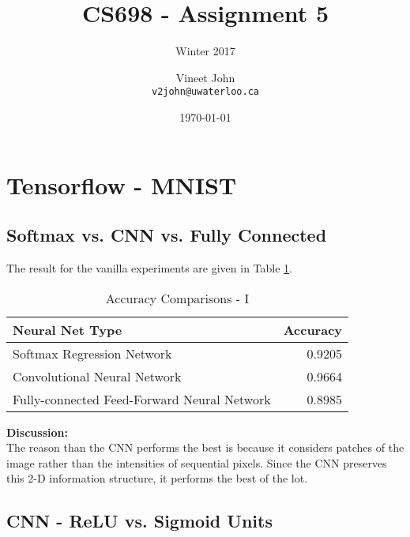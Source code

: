 \documentclass[parskip=half]{scrartcl}
\begin{document}
\title{CS698 - Assignment 5}
\subtitle{Winter 2017}
\author{
    Vineet John\\
    \texttt{v2john@uwaterloo.ca}
}
\date{\today}
\maketitle


\section{Tensorflow - MNIST} %
\label{sec:tensorflow_mnist}

    \subsection{Softmax vs. CNN vs. Fully Connected} %
    \label{sub:softmax_vs_cnn_vs_fully_connected}

        The result for the vanilla experiments are given in Table \ref{tab:accuracy_comparisons_i}.
        \begin{table}[th]
            \centering
            \begin{tabular}{| l | r |}
            \hline
            \textbf{Neural Net Type} & \textbf{Accuracy} \\
            \hline
                \hline
                Softmax Regression Network & 0.9205 \\
                \hline
                Convolutional Neural Network & 0.9664 \\
                \hline
                Fully-connected Feed-Forward Neural Network & 0.8985 \\
            \hline
            \end{tabular}
            \caption{Accuracy Comparisons - I}
            \label{tab:accuracy_comparisons_i}
        \end{table}

        \textbf{Discussion:}\\
        The reason than the CNN performs the best is because it considers patches of the image rather than the intensities of sequential pixels. Since the CNN preserves this 2-D information structure, it performs the best of the lot.
    

    \subsection{CNN - ReLU vs. Sigmoid Units} %
    \label{sub:cnn_relu_vs_sigmoid_units}
\end{document}
